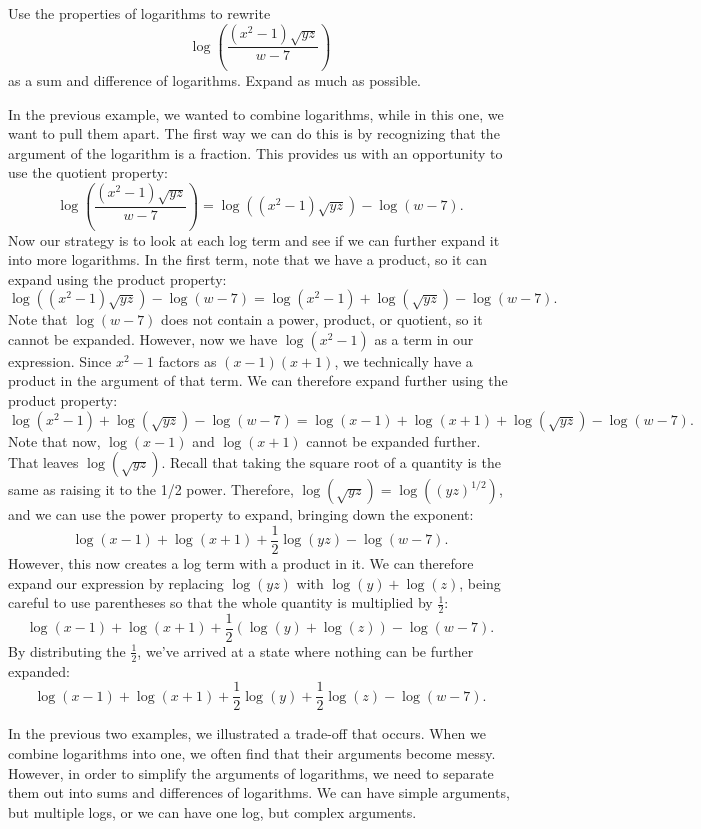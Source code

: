 \documentclass[nooutcomes]{ximera}
\begin{document}
\begin{example}
Use the properties of logarithms to rewrite 
$$
\log\left(\frac{(x^2 - 1)\sqrt{yz}}{w - 7}\right)
$$
as a sum and difference of logarithms. Expand as much as possible. 

\begin{explanation}
In the previous example, we wanted to combine logarithms, while in this one, we want to pull them apart. The first way we can do this is by recognizing that the argument of the logarithm is a fraction. This provides us with an opportunity to use the quotient property: 
$$
\log\left(\frac{(x^2 - 1)\sqrt{yz}}{w - 7}\right) = \log((x^2 - 1)\sqrt{yz}) - \log(w - 7). 
$$
Now our strategy is to look at each log term and see if we can further expand it into more logarithms. In the first term, note that we have a product, so it can expand using the product property:
$$
 \log((x^2 - 1)\sqrt{yz}) - \log(w - 7) = \log(x^2 - 1) + \log(\sqrt{yz}) - \log(w - 7). 
$$
Note that $\log(w - 7)$ does not contain a power, product, or quotient, so it cannot be expanded. However, now we have $\log(x^2 - 1)$ as a term in our expression. Since $x^2 - 1$ factors as $(x - 1)(x + 1)$, we technically have a product in the argument of that term. We can therefore expand further using the product property: 
$$
\log(x^2 - 1) + \log(\sqrt{yz}) - \log(w - 7) = \log(x - 1) + \log(x + 1) + \log(\sqrt{yz}) - \log(w - 7).
$$
Note that now, $\log(x - 1)$ and $\log(x + 1)$ cannot be expanded further. That leaves $\log(\sqrt{yz})$. Recall that taking the square root of a quantity is the same as raising it to the 1/2 power. Therefore, $\log(\sqrt{yz}) = \log((yz)^{1/2})$, and we can use the power property to expand, bringing down the exponent:
$$
\log(x - 1) + \log(x + 1) + \frac{1}{2}\log(yz) - \log(w - 7).
$$
However, this now creates a log term with a product in it. We can therefore expand our expression by replacing $\log(yz)$ with $\log(y) + \log(z)$, being careful to use parentheses so that the whole quantity is multiplied by $\frac{1}{2}$:
$$
\log(x - 1) + \log(x + 1) + \frac{1}{2}(\log(y) + \log(z))- \log(w - 7).
$$
By distributing the $\frac{1}{2}$, we've arrived at a state where nothing can be further expanded:
$$
\log(x - 1) + \log(x + 1) + \frac{1}{2}\log(y) + \frac{1}{2}\log(z)- \log(w - 7).
$$
\end{explanation}
\end{example}

In the previous two examples, we illustrated a trade-off that occurs. When we combine logarithms into one, we often find that their arguments become messy. However, in order to simplify the arguments of logarithms, we need to separate them out into sums and differences of logarithms. We can have simple arguments, but multiple logs, or we can have one log, but complex arguments. 
\end{document}

